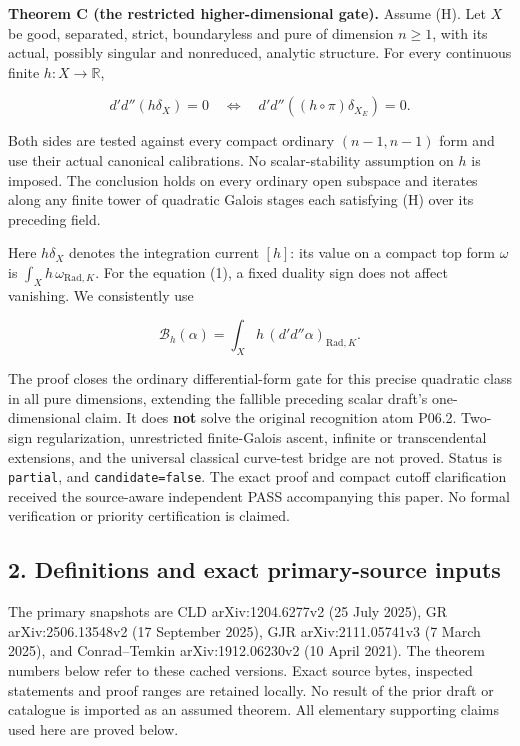 \documentclass[
  11pt,
]{article}
\begin{document}
\textbf{Theorem C (the restricted higher-dimensional gate).} Assume (H).
Let \(X\) be good, separated, strict, boundaryless and pure of dimension
\(n\geq1\), with its actual, possibly singular and nonreduced, analytic
structure. For every continuous finite \(h:X\to\mathbb R\),

\[
d'd''(h\delta_X)=0
\quad\Longleftrightarrow\quad
d'd''((h\circ\pi)\delta_{X_E})=0. \tag{1}
\]

Both sides are tested against every compact ordinary \((n-1,n-1)\) form
and use their actual canonical calibrations. No scalar-stability
assumption on \(h\) is imposed. The conclusion holds on every ordinary
open subspace and iterates along any finite tower of quadratic Galois
stages each satisfying (H) over its preceding field.

Here \(h\delta_X\) denotes the integration current \([h]\): its value on
a compact top form \(\omega\) is \(\int_X h\,\omega_{\mathrm{Rad},K}\).
For the equation (1), a fixed duality sign does not affect vanishing. We
consistently use

\[\mathcal B_h(\alpha)=\int_X h\,(d'd''\alpha)_{\mathrm{Rad},K}.\]

The proof closes the ordinary differential-form gate for this precise
quadratic class in all pure dimensions, extending the fallible preceding
scalar draft's one-dimensional claim. It does \textbf{not} solve the
original recognition atom P06.2. Two-sign regularization, unrestricted
finite-Galois ascent, infinite or transcendental extensions, and the
universal classical curve-test bridge are not proved. Status is
\texttt{partial}, and \texttt{candidate=false}. The exact proof and
compact cutoff clarification received the source-aware independent
PASS accompanying this paper. No formal verification or priority
certification is claimed.

\subsection{2. Definitions and exact primary-source
inputs}\label{definitions-and-exact-primary-source-inputs}

The primary snapshots are CLD arXiv:1204.6277v2 (25 July 2025), GR
arXiv:2506.13548v2 (17 September 2025), GJR arXiv:2111.05741v3 (7 March
2025), and Conrad--Temkin arXiv:1912.06230v2 (10 April 2021). The
theorem numbers below refer to these cached versions. Exact source
bytes, inspected statements and proof ranges are retained locally. No
result of the prior draft or catalogue is imported as an assumed
theorem. All elementary supporting claims used here are proved below.
\end{document}
